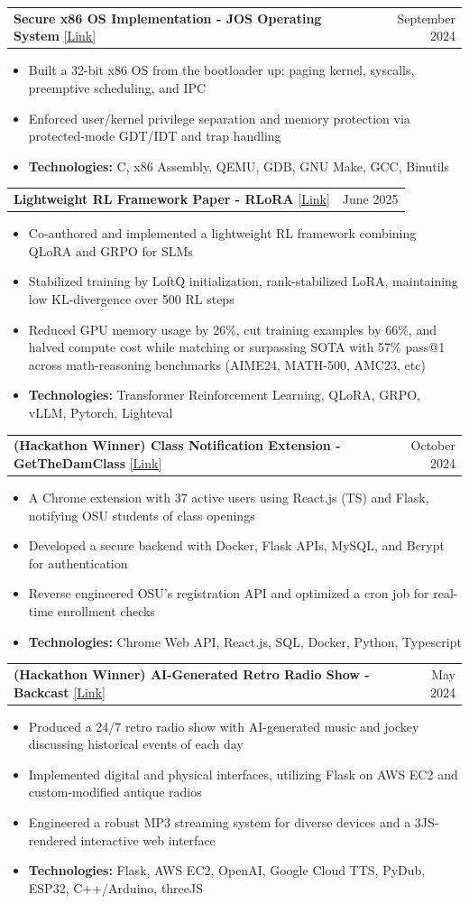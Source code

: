 \documentclass[letterpaper,11pt]{article}
\makeatletter
\newcommand{\resumeItem}[1]{%
\item\small{%
    {#1\vspace{-2pt}}%
  }%
}
\newcommand{\resumeProjectHeading}[2]{
\item
  \begin{tabular*}{0.97\textwidth}{l@{\extracolsep{\fill}}r}
    \small#1 & #2 \\
  \end{tabular*}\vspace{-7pt}
}
\newcommand{\resumeItemListStart}{
\begin{itemize}}
\newcommand{\resumeItemListEnd}{
\end{itemize}\vspace{-5pt}}
\makeatother
\begin{document}
\resumeProjectHeading
{\textbf{Secure x86 OS Implementation - JOS Operating System} \href{https://github.com/aj-arts/jos-operating-system-implementation}{[Link]}}{September 2024}
\resumeItemListStart
\resumeItem{Built a 32-bit x86 OS from the bootloader up: paging kernel, syscalls, preemptive scheduling, and IPC}
\resumeItem{Enforced user/kernel privilege separation and memory protection via protected-mode GDT/IDT and trap handling}
\resumeItem{\textbf{Technologies:} C, x86 Assembly, QEMU, GDB, GNU Make, GCC, Binutils}
\resumeItemListEnd

\resumeProjectHeading
{\textbf{Lightweight RL Framework Paper - RLoRA} \href{https://tinyurl.com/rlorafullpaper}{[Link]}}{June 2025}
\resumeItemListStart
\resumeItem{Co-authored and implemented a lightweight RL framework combining QLoRA and GRPO for SLMs}
\resumeItem{Stabilized training by LoftQ initialization, rank-stabilized LoRA, maintaining low KL-divergence over 500 RL steps}
\resumeItem{Reduced GPU memory usage by 26\%, cut training examples by 66\%, and halved compute cost while matching or surpassing SOTA with 57\% pass@1 across math-reasoning benchmarks (AIME24, MATH-500, AMC23, etc)}
\resumeItem{\textbf{Technologies:} Transformer Reinforcement Learning, QLoRA, GRPO, vLLM, Pytorch, Lighteval}
\resumeItemListEnd

\resumeProjectHeading
{\textbf{(Hackathon Winner) Class Notification Extension - GetTheDamClass} \href{https://devpost.com/software/getthedamclass}{[Link]}}{October 2024}
\resumeItemListStart
\resumeItem{A Chrome extension with 37 active users using React.js (TS) and Flask, notifying OSU students of class openings}
\resumeItem{Developed a secure backend with Docker, Flask APIs, MySQL, and Bcrypt for authentication}
\resumeItem{Reverse engineered OSU's registration API and optimized a cron job for real-time enrollment checks}
\resumeItem{\textbf{Technologies:} Chrome Web API, React.js, SQL, Docker, Python, Typescript}
\resumeItemListEnd

\resumeProjectHeading
{\textbf{(Hackathon Winner) AI-Generated Retro Radio Show - Backcast} \href{https://devpost.com/software/timeless-w1ze62}{[Link]}}{May 2024}
\resumeItemListStart
\resumeItem{Produced a 24/7 retro radio show with AI-generated music and jockey discussing historical events of each day}
\resumeItem{Implemented digital and physical interfaces, utilizing Flask on AWS EC2 and custom-modified antique radios}
\resumeItem{Engineered a robust MP3 streaming system for diverse devices and a 3JS-rendered interactive web interface}
\resumeItem{\textbf{Technologies:} Flask, AWS EC2, OpenAI, Google Cloud TTS, PyDub, ESP32, C++/Arduino, threeJS}
\resumeItemListEnd
\end{document}
